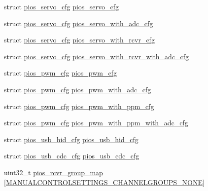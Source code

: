 \begin{DoxyCompactItemize}
struct \hyperlink{structpios__servo__cfg}{pios\-\_\-servo\-\_\-cfg} \hyperlink{group___quanton_ga57a87ef16d7949a9cc3589efc8d88a28}{pios\-\_\-servo\-\_\-cfg}
\item 
struct \hyperlink{structpios__servo__cfg}{pios\-\_\-servo\-\_\-cfg} \hyperlink{group___quanton_ga7364dfea1ec6777467be23eca90eddc4}{pios\-\_\-servo\-\_\-with\-\_\-adc\-\_\-cfg}
\item 
struct \hyperlink{structpios__servo__cfg}{pios\-\_\-servo\-\_\-cfg} \hyperlink{group___quanton_gacc33e67397fe094afb637cb843497083}{pios\-\_\-servo\-\_\-with\-\_\-rcvr\-\_\-cfg}
\item 
struct \hyperlink{structpios__servo__cfg}{pios\-\_\-servo\-\_\-cfg} \hyperlink{group___quanton_gaed77c96c690e403837b69dc13dcc4a1b}{pios\-\_\-servo\-\_\-with\-\_\-rcvr\-\_\-with\-\_\-adc\-\_\-cfg}
\item 
struct \hyperlink{structpios__pwm__cfg}{pios\-\_\-pwm\-\_\-cfg} \hyperlink{group___quanton_ga7587f8e174df90bef8cec1edfa9e14c1}{pios\-\_\-pwm\-\_\-cfg}
\item 
struct \hyperlink{structpios__pwm__cfg}{pios\-\_\-pwm\-\_\-cfg} \hyperlink{group___quanton_gac125e93a9cdacd5d46c2c46fd0892baf}{pios\-\_\-pwm\-\_\-with\-\_\-adc\-\_\-cfg}
\item 
struct \hyperlink{structpios__pwm__cfg}{pios\-\_\-pwm\-\_\-cfg} \hyperlink{group___quanton_ga6a7a8338c617f18384f3b3c5678f5505}{pios\-\_\-pwm\-\_\-with\-\_\-ppm\-\_\-cfg}
\item 
struct \hyperlink{structpios__pwm__cfg}{pios\-\_\-pwm\-\_\-cfg} \hyperlink{group___quanton_ga378b6a6bdbab403bbbce1ec7ab110d48}{pios\-\_\-pwm\-\_\-with\-\_\-ppm\-\_\-with\-\_\-adc\-\_\-cfg}
\item 
struct \hyperlink{structpios__usb__hid__cfg}{pios\-\_\-usb\-\_\-hid\-\_\-cfg} \hyperlink{group___quanton_ga3665f6d3a2cccc431b55b9432291e94c}{pios\-\_\-usb\-\_\-hid\-\_\-cfg}
\item 
struct \hyperlink{structpios__usb__cdc__cfg}{pios\-\_\-usb\-\_\-cdc\-\_\-cfg} \hyperlink{group___quanton_ga05cc3e449d417c7f9097d2659e6f5ca3}{pios\-\_\-usb\-\_\-cdc\-\_\-cfg}
\item 
uint32\-\_\-t \hyperlink{group___quanton_ga6c6cfc16eb738e47c123298e062297e2}{pios\-\_\-rcvr\-\_\-group\-\_\-map} \mbox{[}\hyperlink{group___manual_control_settings_gga94e1fe696fef2f85cbdb4a2e479c7ed2af9104b4e2c50328b0912db1e10fc3074}{\-M\-A\-N\-U\-A\-L\-C\-O\-N\-T\-R\-O\-L\-S\-E\-T\-T\-I\-N\-G\-S\-\_\-\-C\-H\-A\-N\-N\-E\-L\-G\-R\-O\-U\-P\-S\-\_\-\-N\-O\-N\-E}\mbox{]}
\item 

\end{DoxyCompactItemize}
